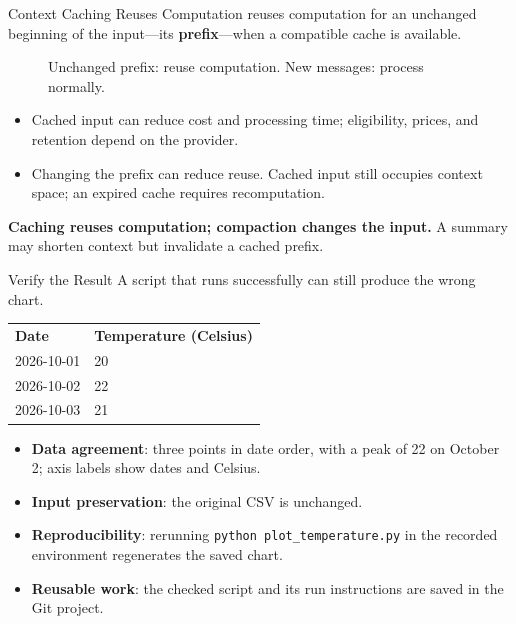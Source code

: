 \begin{frame}{Context Caching Reuses Computation}
\small
\setlength{\abovecaptionskip}{0pt}
 reuses computation for an unchanged beginning of the input---its \textbf{prefix}---when a compatible cache is available.
\begin{figure}\centering
{}
\caption{Unchanged prefix: reuse computation. New messages: process normally.}
\end{figure}
\begin{itemize}
\setlength{\itemsep}{0pt}
\item Cached input can reduce cost and processing time; eligibility, prices, and retention depend on the provider.
\item Changing the prefix can reduce reuse. Cached input still occupies context space; an expired cache requires recomputation.
\end{itemize}
\par
\textbf{Caching reuses computation; compaction changes the input.} A summary may shorten context but invalidate a cached prefix.
\end{frame}

\begin{frame}{Verify the Result}
\small
A script that runs successfully can still produce the wrong chart.
\par\medskip
{}
\begin{center}
\begin{tabular}{ll}
\textbf{Date} & \textbf{Temperature (Celsius)} \\
2026-10-01 & 20 \\
2026-10-02 & 22 \\
2026-10-03 & 21 \\
\end{tabular}
\end{center}
\begin{itemize}
\item \textbf{Data agreement}: three points in date order, with a peak of 22 on October 2; axis labels show dates and Celsius.
\item \textbf{Input preservation}: the original CSV is unchanged.
\item \textbf{Reproducibility}: rerunning \texttt{python plot\_temperature.py} in the recorded environment regenerates the saved chart.
\item \textbf{Reusable work}: the checked script and its run instructions are saved in the Git project.
\end{itemize}
\end{frame}

